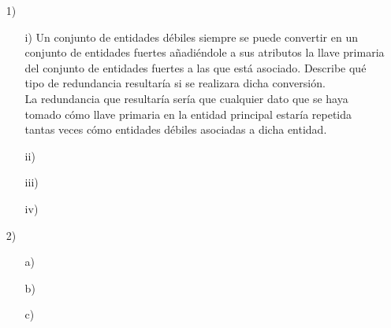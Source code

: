 \documentclass[a4paper, 12pt]{report}
\begin{document}
\begin{enumerate}
\item[1)]{
\begin{enumerate}
    \item[i)]{Un conjunto de entidades débiles siempre se puede convertir en un
        conjunto de entidades fuertes añadiéndole a sus atributos la llave
        primaria del conjunto de entidades fuertes a las que está asociado.
        Describe qué tipo de redundancia resultaría si se realizara dicha
        conversión.\\
        La redundancia que resultaría sería que cualquier dato que se haya
        tomado cómo llave primaria en la entidad principal estaría repetida
        tantas veces cómo entidades débiles asociadas a dicha entidad.
    }
    \item[ii)]{}
    \item[iii)]{}
    \item[iv)]{}
\end{enumerate}
}
\item[2)]{
\begin{enumerate}
    \item[a)]{}
    \item[b)]{}
    \item[c)]{}
\end{enumerate}
}
\end{enumerate}


\begin{thebibliography}{20}
\end{thebibliography}
\end{document}

